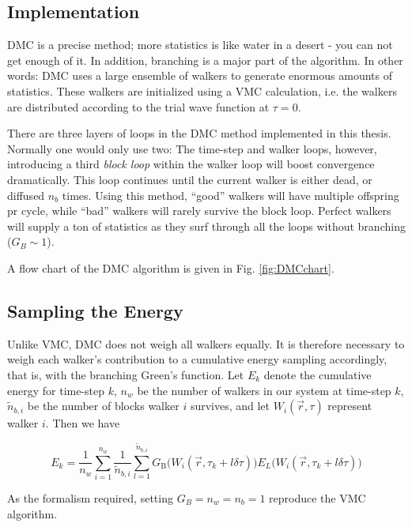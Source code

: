 \subsection{Implementation}

DMC is a precise method; more statistics is like water in a desert - you can not get enough of it. In addition, branching is a major part of the algorithm. In other words: DMC uses a large ensemble of walkers to generate enormous amounts of statistics. These walkers are initialized using a VMC calculation, i.e. the walkers are distributed according to the trial wave function at $\tau=0$. 

There are three layers of loops in the DMC method implemented in this thesis. Normally one would only use two: The time-step and walker loops, however, introducing a third \textit{block loop} within the walker loop will boost convergence dramatically. This loop continues until the current walker is either dead, or diffused $n_b$ times. Using this method, ``good'' walkers will have multiple offspring pr cycle, while ``bad'' walkers will rarely survive the block loop. Perfect walkers will supply a ton of statistics as they surf through all the loops without branching ($G_B \sim 1$).

A flow chart of the DMC algorithm is given in Fig. \ref{fig:DMCchart}. 

\subsection{Sampling the Energy}

Unlike VMC, DMC does not weigh all walkers equally. It is therefore necessary to weigh each walker's contribution to a cumulative energy sampling accordingly, that is, with the branching Green's function. Let $E_k$ denote the cumulative energy for time-step $k$, $n_w$ be the number of walkers in our system at time-step $k$, $\tilde n_{b,i}$ be the number of blocks walker $i$ survives, and let $W_i(\vec r, \tau)$ represent walker $i$. Then we have

\begin{equation}
 E_k = \frac{1}{n_w}\sum_{i=1}^{n_w} \frac{1}{\tilde n_{b,i}}\sum_{l=1}^{\tilde n_{b,i}} G_\mathrm{B}\Big(W_i(\vec r, \tau_k + l\delta\tau)\Big)E_L\Big(W_i(\vec r, \tau_k + l\delta\tau)\Big)
\end{equation}

As the formalism required, setting $G_B = n_w = n_b = 1$ reproduce the VMC algorithm. 

